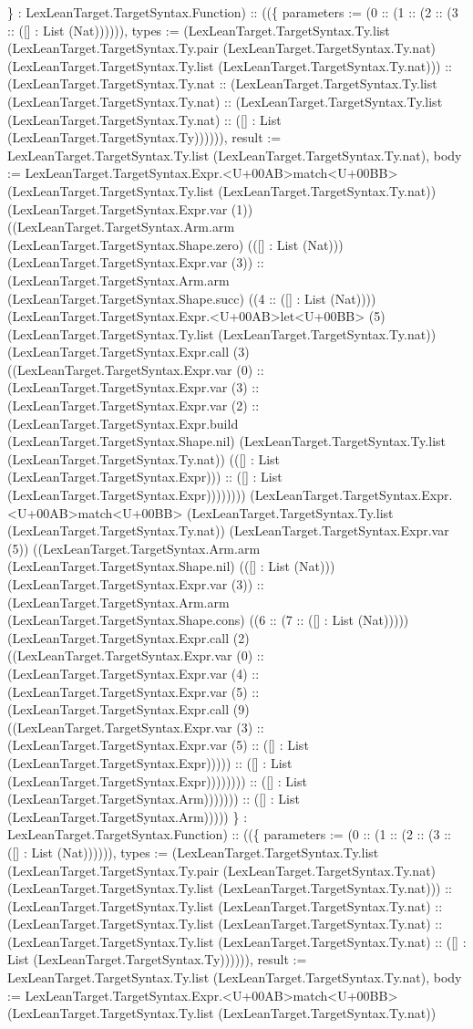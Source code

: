\documentclass[11pt]{article}
\begin{document}
\} : LexLeanTarget.TargetSyntax.Function) :: ((\{ parameters := (0 :: (1 :: (2 :: (3 :: ([] : List (Nat)))))), types := (LexLeanTarget.TargetSyntax.Ty.list (LexLeanTarget.TargetSyntax.Ty.pair (LexLeanTarget.TargetSyntax.Ty.nat) (LexLeanTarget.TargetSyntax.Ty.list (LexLeanTarget.TargetSyntax.Ty.nat))) :: (LexLeanTarget.TargetSyntax.Ty.nat :: (LexLeanTarget.TargetSyntax.Ty.list (LexLeanTarget.TargetSyntax.Ty.nat) :: (LexLeanTarget.TargetSyntax.Ty.list (LexLeanTarget.TargetSyntax.Ty.nat) :: ([] : List (LexLeanTarget.TargetSyntax.Ty)))))), result := LexLeanTarget.TargetSyntax.Ty.list (LexLeanTarget.TargetSyntax.Ty.nat), body := LexLeanTarget.TargetSyntax.Expr.<U+00AB>match<U+00BB> (LexLeanTarget.TargetSyntax.Ty.list (LexLeanTarget.TargetSyntax.Ty.nat)) (LexLeanTarget.TargetSyntax.Expr.var (1)) ((LexLeanTarget.TargetSyntax.Arm.arm (LexLeanTarget.TargetSyntax.Shape.zero) (([] : List (Nat))) (LexLeanTarget.TargetSyntax.Expr.var (3)) :: (LexLeanTarget.TargetSyntax.Arm.arm (LexLeanTarget.TargetSyntax.Shape.succ) ((4 :: ([] : List (Nat)))) (LexLeanTarget.TargetSyntax.Expr.<U+00AB>let<U+00BB> (5) (LexLeanTarget.TargetSyntax.Ty.list (LexLeanTarget.TargetSyntax.Ty.nat)) (LexLeanTarget.TargetSyntax.Expr.call (3) ((LexLeanTarget.TargetSyntax.Expr.var (0) :: (LexLeanTarget.TargetSyntax.Expr.var (3) :: (LexLeanTarget.TargetSyntax.Expr.var (2) :: (LexLeanTarget.TargetSyntax.Expr.build (LexLeanTarget.TargetSyntax.Shape.nil) (LexLeanTarget.TargetSyntax.Ty.list (LexLeanTarget.TargetSyntax.Ty.nat)) (([] : List (LexLeanTarget.TargetSyntax.Expr))) :: ([] : List (LexLeanTarget.TargetSyntax.Expr)))))))) (LexLeanTarget.TargetSyntax.Expr.<U+00AB>match<U+00BB> (LexLeanTarget.TargetSyntax.Ty.list (LexLeanTarget.TargetSyntax.Ty.nat)) (LexLeanTarget.TargetSyntax.Expr.var (5)) ((LexLeanTarget.TargetSyntax.Arm.arm (LexLeanTarget.TargetSyntax.Shape.nil) (([] : List (Nat))) (LexLeanTarget.TargetSyntax.Expr.var (3)) :: (LexLeanTarget.TargetSyntax.Arm.arm (LexLeanTarget.TargetSyntax.Shape.cons) ((6 :: (7 :: ([] : List (Nat))))) (LexLeanTarget.TargetSyntax.Expr.call (2) ((LexLeanTarget.TargetSyntax.Expr.var (0) :: (LexLeanTarget.TargetSyntax.Expr.var (4) :: (LexLeanTarget.TargetSyntax.Expr.var (5) :: (LexLeanTarget.TargetSyntax.Expr.call (9) ((LexLeanTarget.TargetSyntax.Expr.var (3) :: (LexLeanTarget.TargetSyntax.Expr.var (5) :: ([] : List (LexLeanTarget.TargetSyntax.Expr))))) :: ([] : List (LexLeanTarget.TargetSyntax.Expr)))))))) :: ([] : List (LexLeanTarget.TargetSyntax.Arm))))))) :: ([] : List (LexLeanTarget.TargetSyntax.Arm))))) \} : LexLeanTarget.TargetSyntax.Function) :: ((\{ parameters := (0 :: (1 :: (2 :: (3 :: ([] : List (Nat)))))), types := (LexLeanTarget.TargetSyntax.Ty.list (LexLeanTarget.TargetSyntax.Ty.pair (LexLeanTarget.TargetSyntax.Ty.nat) (LexLeanTarget.TargetSyntax.Ty.list (LexLeanTarget.TargetSyntax.Ty.nat))) :: (LexLeanTarget.TargetSyntax.Ty.list (LexLeanTarget.TargetSyntax.Ty.nat) :: (LexLeanTarget.TargetSyntax.Ty.list (LexLeanTarget.TargetSyntax.Ty.nat) :: (LexLeanTarget.TargetSyntax.Ty.list (LexLeanTarget.TargetSyntax.Ty.nat) :: ([] : List (LexLeanTarget.TargetSyntax.Ty)))))), result := LexLeanTarget.TargetSyntax.Ty.list (LexLeanTarget.TargetSyntax.Ty.nat), body := LexLeanTarget.TargetSyntax.Expr.<U+00AB>match<U+00BB> (LexLeanTarget.TargetSyntax.Ty.list (LexLeanTarget.TargetSyntax.Ty.nat)) 
\end{document}
